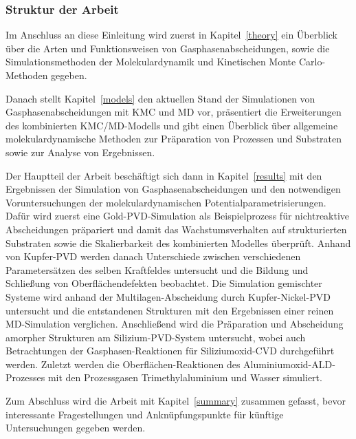 \subsubsection{Struktur der Arbeit}

Im Anschluss an diese Einleitung wird zuerst in Kapitel~\ref{theory} ein Überblick über die Arten und Funktionsweisen von Gasphasenabscheidungen, sowie die Simulationsmethoden der Molekulardynamik und Kinetischen Monte Carlo-Methoden gegeben.

Danach stellt Kapitel~\ref{models} den aktuellen Stand der Simulationen von Gasphasenabscheidungen mit KMC und MD vor, präsentiert die Erweiterungen des kombinierten KMC/MD-Modells und gibt einen Überblick über allgemeine molekulardynamische Methoden zur Präparation von Prozessen und Substraten sowie zur Analyse von Ergebnissen.

Der Hauptteil der Arbeit beschäftigt sich dann in Kapitel~\ref{results} mit den Ergebnissen der Simulation von Gasphasenabscheidungen und den notwendigen Voruntersuchungen der molekulardynamischen Potentialparametrisierungen.
Dafür wird zuerst eine Gold-PVD-Simulation als Beispielprozess für nichtreaktive Abscheidungen präpariert und damit das Wachstumsverhalten auf strukturierten Substraten sowie die Skalierbarkeit des kombinierten Modelles überprüft.
Anhand von Kupfer-PVD werden danach Unterschiede zwischen verschiedenen Parametersätzen des selben Kraftfeldes untersucht und die Bildung und Schließung von Oberflächendefekten beobachtet.
Die Simulation gemischter Systeme wird anhand der Multilagen-Abscheidung durch Kupfer-Nickel-PVD untersucht und die entstandenen Strukturen mit den Ergebnissen einer reinen MD-Simulation verglichen.
Anschließend wird die Präparation und Abscheidung amorpher Strukturen am Silizium-PVD-System untersucht, wobei auch Betrachtungen der Gasphasen-Reaktionen für Siliziumoxid-CVD durchgeführt werden.
Zuletzt werden die Oberflächen-Reaktionen des Aluminiumoxid-ALD-Prozesses mit den Prozessgasen Trimethylaluminium und Wasser simuliert.

Zum Abschluss wird die Arbeit mit Kapitel~\ref{summary} zusammen gefasst, bevor interessante Fragestellungen und Anknüpfungspunkte für künftige Untersuchungen gegeben werden.

